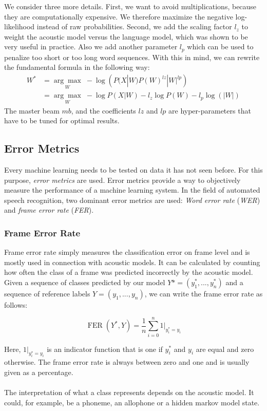 We consider three more details. First, we want to avoid multiplications, because they are computationally expensive. We therefore maximize the negative log-likelihood instead of raw probabilities. Second, we add the scaling factor $l_z$ to weight the acoustic model versus the language model, which was shown to be very useful in practice. Also we add another parameter $l_p$ which can be used to penalize too short or too long word sequences. With this in mind, we can rewrite the fundamental formula in the following way: 
\begin{align*}
W^* &= \underset{W}{\arg \max} \; -\log\left(P(X|W) P(W)^{lz} |W|^{lp} \right) \\
&= \underset{W}{\arg \max} \; -\log P(X|W) - l_z\log P(W) -l_p\log(|W|) 
\end{align*}
The master beam $mb$, and the coefficients $lz$ and $lp$ are hyper-parameters that have to be tuned for optimal results.

\subsection{Error Metrics}
Every machine learning needs to be tested on data it has not seen before. For this purpose, \textit{error metrics} are used. Error metrics provide a way to objectively measure the performance of a machine learning system. In the field of automated speech recognition, two dominant error metrics are used: \textit{Word error rate} (\textit{WER}) and \textit{frame error rate} (\textit{FER}).

\subsubsection{Frame Error Rate}
Frame error rate simply measures the classification error on frame level and is mostly used in connection with acoustic models. It can be calculated by counting how often the class of a frame was predicted incorrectly by the acoustic model. Given a sequence of classes predicted by our model $Y* = (y^*_1, ..., y^*_n)$ and a sequence of reference labels $Y = (y_1, ..., y_n)$, we can write the frame error rate as follows:

\[
\operatorname{FER}(Y^*, Y) = \frac{1}{n} \sum_{i = 0}^n 1|_{y^*_i = y_i} 
\]

Here, $1|_{y^*_i = y_i}$ is an indicator function that is one if $y^*_i$ and $y_i$ are equal and zero otherwise. The frame error rate is always between zero and one and is usually given as a percentage. 
\\ \\ 
The interpretation of what a class represents depends on the acoustic model. It could, for example, be a phoneme, an allophone or a hidden markov model state. 

